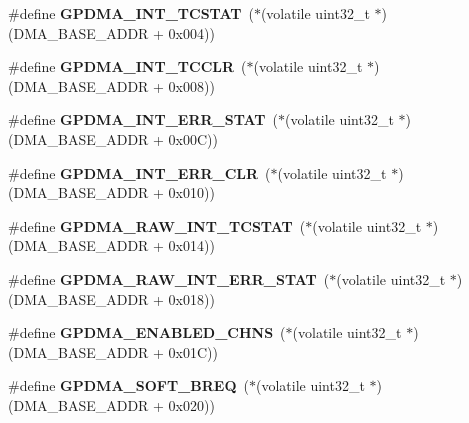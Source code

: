\begin{DoxyCompactItemize}
\#define {\bfseries G\+P\+D\+M\+A\+\_\+\+I\+N\+T\+\_\+\+T\+C\+S\+T\+AT}~($\ast$(volatile uint32\+\_\+t $\ast$) (D\+M\+A\+\_\+\+B\+A\+S\+E\+\_\+\+A\+D\+DR + 0x004))
\item 
\mbox{\label{group__lpc24xx__regs_ga34cb032650bb6c4398cdaf6b236a34be}} 
\#define {\bfseries G\+P\+D\+M\+A\+\_\+\+I\+N\+T\+\_\+\+T\+C\+C\+LR}~($\ast$(volatile uint32\+\_\+t $\ast$) (D\+M\+A\+\_\+\+B\+A\+S\+E\+\_\+\+A\+D\+DR + 0x008))
\item 
\mbox{\label{group__lpc24xx__regs_ga44fe71cbcdeebc2ea98c2b07f1f92243}} 
\#define {\bfseries G\+P\+D\+M\+A\+\_\+\+I\+N\+T\+\_\+\+E\+R\+R\+\_\+\+S\+T\+AT}~($\ast$(volatile uint32\+\_\+t $\ast$) (D\+M\+A\+\_\+\+B\+A\+S\+E\+\_\+\+A\+D\+DR + 0x00\+C))
\item 
\mbox{\label{group__lpc24xx__regs_gacfa49cc225cdb3fbc5aa0811306eec91}} 
\#define {\bfseries G\+P\+D\+M\+A\+\_\+\+I\+N\+T\+\_\+\+E\+R\+R\+\_\+\+C\+LR}~($\ast$(volatile uint32\+\_\+t $\ast$) (D\+M\+A\+\_\+\+B\+A\+S\+E\+\_\+\+A\+D\+DR + 0x010))
\item 
\mbox{\label{group__lpc24xx__regs_gae788c5c8f64e5df6e7916689489b9afa}} 
\#define {\bfseries G\+P\+D\+M\+A\+\_\+\+R\+A\+W\+\_\+\+I\+N\+T\+\_\+\+T\+C\+S\+T\+AT}~($\ast$(volatile uint32\+\_\+t $\ast$) (D\+M\+A\+\_\+\+B\+A\+S\+E\+\_\+\+A\+D\+DR + 0x014))
\item 
\mbox{\label{group__lpc24xx__regs_ga878f4640315d4a419cad8c44b3e29523}} 
\#define {\bfseries G\+P\+D\+M\+A\+\_\+\+R\+A\+W\+\_\+\+I\+N\+T\+\_\+\+E\+R\+R\+\_\+\+S\+T\+AT}~($\ast$(volatile uint32\+\_\+t $\ast$) (D\+M\+A\+\_\+\+B\+A\+S\+E\+\_\+\+A\+D\+DR + 0x018))
\item 
\mbox{\label{group__lpc24xx__regs_ga8c0936663c8754bfdb663d99ce851b56}} 
\#define {\bfseries G\+P\+D\+M\+A\+\_\+\+E\+N\+A\+B\+L\+E\+D\+\_\+\+C\+H\+NS}~($\ast$(volatile uint32\+\_\+t $\ast$) (D\+M\+A\+\_\+\+B\+A\+S\+E\+\_\+\+A\+D\+DR + 0x01\+C))
\item 
\mbox{\label{group__lpc24xx__regs_ga58522bd0b4dee763737015d6932924ff}} 
\#define {\bfseries G\+P\+D\+M\+A\+\_\+\+S\+O\+F\+T\+\_\+\+B\+R\+EQ}~($\ast$(volatile uint32\+\_\+t $\ast$) (D\+M\+A\+\_\+\+B\+A\+S\+E\+\_\+\+A\+D\+DR + 0x020))

\end{DoxyCompactItemize}
